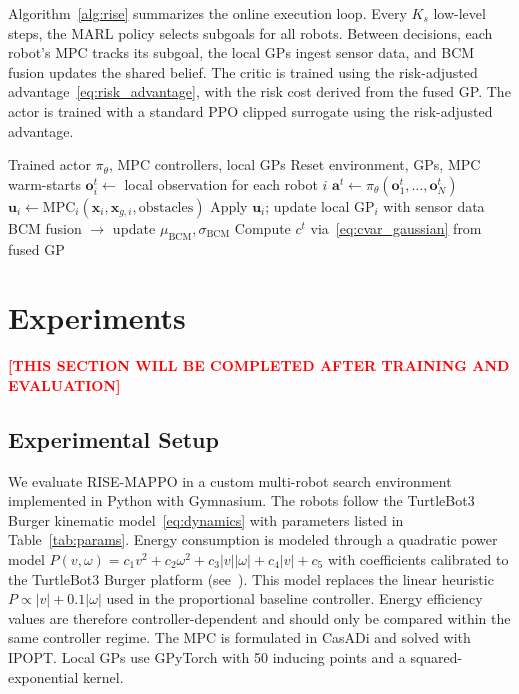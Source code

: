 \documentclass[letterpaper]{IEEEtran}
\newcommand{\xbf}{\mathbf{x}}
\newcommand{\ubf}{\mathbf{u}}
\newcommand{\obf}{\mathbf{o}}
\newcommand{\abf}{\mathbf{a}}
\begin{document}
Algorithm~\ref{alg:rise} summarizes the online execution loop. Every $K_s$ low-level steps, the MARL policy selects subgoals for all robots. Between decisions, each robot's MPC tracks its subgoal, the local GPs ingest sensor data, and BCM fusion updates the shared belief. The critic is trained using the risk-adjusted advantage~\eqref{eq:risk_advantage}, with the risk cost derived from the fused GP. The actor is trained with a standard PPO clipped surrogate using the risk-adjusted advantage.

\begin{algorithm}[t]
\caption{RISE-MAPPO Online Execution}
\label{alg:rise}
\begin{algorithmic}[1]
\REQUIRE Trained actor $\pi_\theta$, MPC controllers, local GPs
    \STATE Reset environment, GPs, MPC warm-starts
        \STATE $\obf_i^t \gets$ local observation for each robot $i$
        \STATE $\abf^t \gets \pi_\theta(\obf_1^t, \dots, \obf_N^t)$ \hfill {}
                \STATE $\ubf_i \gets \text{MPC}_i(\xbf_i, \xbf_{g,i}, \text{obstacles})$
                \STATE Apply $\ubf_i$; update local GP$_i$ with sensor data
            \ENDFOR
        \ENDFOR
        \STATE BCM fusion $\to$ update $\mu_{\text{BCM}}, \sigma_{\text{BCM}}$
        \STATE Compute $c^t$ via~\eqref{eq:cvar_gaussian} from fused GP
    \ENDFOR
\ENDFOR
\end{algorithmic}
\end{algorithm}

\section{Experiments}
\label{sec:experiments}

\textcolor{red}{\textbf{[THIS SECTION WILL BE COMPLETED AFTER TRAINING AND EVALUATION]}}

\subsection{Experimental Setup}

We evaluate RISE-MAPPO in a custom multi-robot search environment implemented in Python with Gymnasium. The robots follow the TurtleBot3 Burger kinematic model~\eqref{eq:dynamics} with parameters listed in Table~\ref{tab:params}. Energy consumption is modeled through a quadratic power model $P(v,\omega) = c_1 v^2 + c_2 \omega^2 + c_3 |v||\omega| + c_4 |v| + c_5$ with coefficients calibrated to the TurtleBot3 Burger platform (see~\cite{dhakal2025gpcvar}). This model replaces the linear heuristic $P \propto |v| + 0.1|\omega|$ used in the proportional baseline controller. Energy efficiency values are therefore controller-dependent and should only be compared within the same controller regime. The MPC is formulated in CasADi and solved with IPOPT. Local GPs use GPyTorch with 50 inducing points and a squared-exponential kernel.
\end{document}
